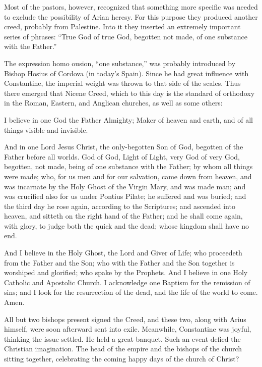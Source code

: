 Most of the pastors, however, recognized that something more specific was needed to exclude the
possibility of Arian heresy. For this purpose they produced another creed, probably from Palestine.
Into it they inserted an extremely important series of phrases: “True God of true God, begotten not
made, of one substance with the Father.”

The expression homo ousion, “one substance,” was probably introduced by Bishop Hosius of Cordova (in
today’s Spain). Since he had great influence with Constantine, the imperial weight was thrown to
that side of the scales. Thus there emerged that Nicene Creed, which to this day is the standard of
orthodoxy in the Roman, Eastern, and Anglican churches, as well as some others:

\begin{blockquote}
I believe in one God the Father Almighty; Maker of heaven and earth, and of all things visible and
invisible.

And in one Lord Jesus Christ, the only-begotten Son of God, begotten of the Father before all
worlds. God of God, Light of Light, very God of very God, begotten, not made, being of one substance
with the Father; by whom all things were made; who, for us men and for our salvation, came down from
heaven, and was incarnate by the Holy Ghost of the Virgin Mary, and was made man; and was crucified
also for us under Pontius Pilate; he suffered and was buried; and the third day he rose again,
according to the Scriptures; and ascended into heaven, and sitteth on the right hand of the Father;
and he shall come again, with glory, to judge both the quick and the dead; whose kingdom shall have
no end.

And I believe in the Holy Ghost, the Lord and Giver of Life; who proceedeth from the Father and the
Son; who with the Father and the Son together is worshiped and glorified; who spake by the Prophets.
And I believe in one Holy Catholic and Apostolic Church. I acknowledge one Baptism for the remission
of sins; and I look for the resurrection of the dead, and the life of the world to come. Amen.
\end{blockquote}

All but two bishops present signed the Creed, and these two, along with Arius himself, were soon
afterward sent into exile. Meanwhile, Constantine was joyful, thinking the issue settled. He held a
great banquet. Such an event defied the Christian imagination. The head of the empire and the
bishops of the church sitting together, celebrating the coming happy days of the church of Christ?

